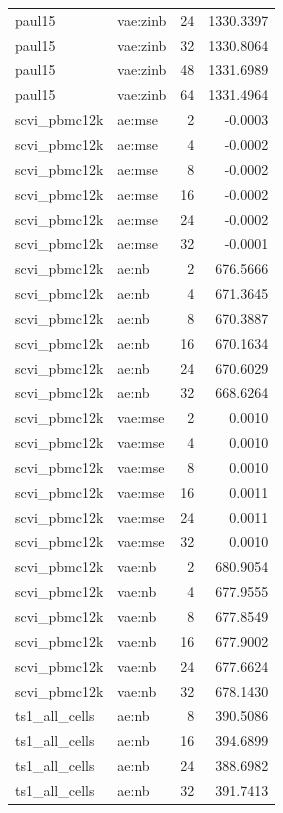 \begin{tabular}{llrr}
paul15 & vae:zinb & 24 & 1330.3397 \\
paul15 & vae:zinb & 32 & 1330.8064 \\
paul15 & vae:zinb & 48 & 1331.6989 \\
paul15 & vae:zinb & 64 & 1331.4964 \\
scvi\_pbmc12k & ae:mse & 2 & -0.0003 \\
scvi\_pbmc12k & ae:mse & 4 & -0.0002 \\
scvi\_pbmc12k & ae:mse & 8 & -0.0002 \\
scvi\_pbmc12k & ae:mse & 16 & -0.0002 \\
scvi\_pbmc12k & ae:mse & 24 & -0.0002 \\
scvi\_pbmc12k & ae:mse & 32 & -0.0001 \\
scvi\_pbmc12k & ae:nb & 2 & 676.5666 \\
scvi\_pbmc12k & ae:nb & 4 & 671.3645 \\
scvi\_pbmc12k & ae:nb & 8 & 670.3887 \\
scvi\_pbmc12k & ae:nb & 16 & 670.1634 \\
scvi\_pbmc12k & ae:nb & 24 & 670.6029 \\
scvi\_pbmc12k & ae:nb & 32 & 668.6264 \\
scvi\_pbmc12k & vae:mse & 2 & 0.0010 \\
scvi\_pbmc12k & vae:mse & 4 & 0.0010 \\
scvi\_pbmc12k & vae:mse & 8 & 0.0010 \\
scvi\_pbmc12k & vae:mse & 16 & 0.0011 \\
scvi\_pbmc12k & vae:mse & 24 & 0.0011 \\
scvi\_pbmc12k & vae:mse & 32 & 0.0010 \\
scvi\_pbmc12k & vae:nb & 2 & 680.9054 \\
scvi\_pbmc12k & vae:nb & 4 & 677.9555 \\
scvi\_pbmc12k & vae:nb & 8 & 677.8549 \\
scvi\_pbmc12k & vae:nb & 16 & 677.9002 \\
scvi\_pbmc12k & vae:nb & 24 & 677.6624 \\
scvi\_pbmc12k & vae:nb & 32 & 678.1430 \\
ts1\_all\_cells & ae:nb & 8 & 390.5086 \\
ts1\_all\_cells & ae:nb & 16 & 394.6899 \\
ts1\_all\_cells & ae:nb & 24 & 388.6982 \\
ts1\_all\_cells & ae:nb & 32 & 391.7413 \\
\bottomrule
\end{tabular}
